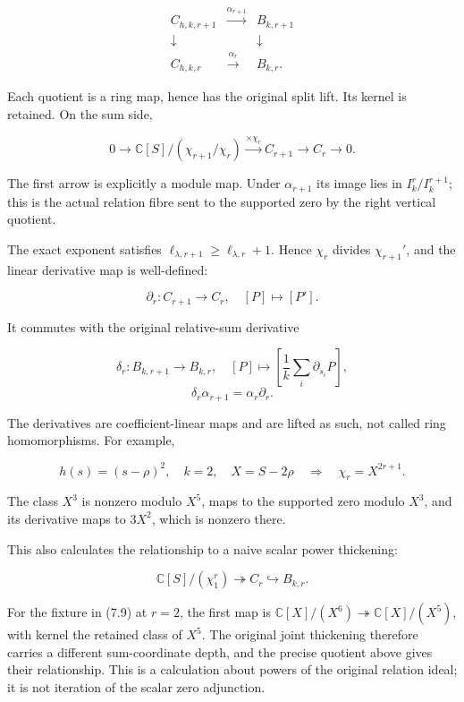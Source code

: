 \documentclass[
]{article}
\begin{document}
\[\begin{array}{ccc}
C_{h,k,r+1}&\xrightarrow{\alpha_{r+1}}&B_{k,r+1}\\
\downarrow&&\downarrow\\
C_{h,k,r}&\xrightarrow{\alpha_r}&B_{k,r}.
\end{array}\tag{7.5}\]

Each quotient is a ring map, hence has the original split lift. Its
kernel is retained. On the sum side,

\[0\to \mathbb C[S]/(\chi_{r+1}/\chi_r)
\xrightarrow{\times\chi_r}C_{r+1}\to C_r\to0.\tag{7.6}\]

The first arrow is explicitly a module map. Under \(\alpha_{r+1}\) its
image lies in \(I_k^r/I_k^{r+1}\); this is the actual relation fibre
sent to the supported zero by the right vertical quotient.

The exact exponent satisfies
\(\ell_{\lambda,r+1}\ge\ell_{\lambda,r}+1\). Hence \(\chi_r\) divides
\(\chi_{r+1}'\), and the linear derivative map is well-defined:

\[\boxed{\partial_r:C_{r+1}\to C_r,\quad[P]\mapsto[P'].}\tag{7.7}\]

It commutes with the original relative-sum derivative

\[\delta_r:B_{k,r+1}\to B_{k,r},\quad
[P]\mapsto\left[\frac1k\sum_i\partial_{s_i}P\right],\]
\[\boxed{\delta_r\alpha_{r+1}=\alpha_r\partial_r.}\tag{7.8}\]

The derivatives are coefficient-linear maps and are lifted as such, not
called ring homomorphisms. For example,

\[h(s)=(s-\rho)^2,\quad k=2,\quad X=S-2\rho
\quad\Longrightarrow\quad\chi_r=X^{2r+1}.\tag{7.9}\]

The class \(X^3\) is nonzero modulo \(X^5\), maps to the supported zero
modulo \(X^3\), and its derivative maps to \(3X^2\), which is nonzero
there.

This also calculates the relationship to a naive scalar power
thickening:

\[\mathbb C[S]/(\chi_1^r)\twoheadrightarrow C_r\hookrightarrow B_{k,r}.\tag{7.10}\]

For the fixture in (7.9) at \(r=2\), the first map is
\(\mathbb C[X]/(X^6)\twoheadrightarrow\mathbb C[X]/(X^5)\), with kernel
the retained class of \(X^5\). The original joint thickening therefore
carries a different sum-coordinate depth, and the precise quotient above
gives their relationship. This is a calculation about powers of the
original relation ideal; it is not iteration of the scalar zero
adjunction.
\end{document}
